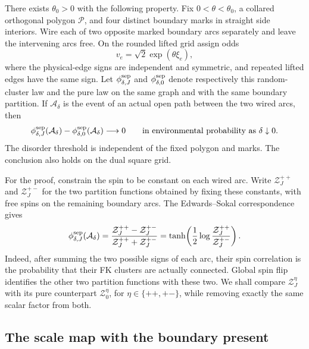 \begin{proposition}
\label{prop:polygon-comparison}
There exists $\theta_0>0$ with the following property.  Fix
$0<\theta<\theta_0$, a collared orthogonal polygon $\mathcal P$, and
four distinct boundary marks in straight side interiors.  Wire each of
two opposite marked boundary arcs separately and leave the intervening
arcs free.  On the rounded lifted grid assign odds
\[
 v_e=\sqrt2\exp(\theta\xi_e),
\]
where the physical-edge signs are independent and symmetric, and
repeated lifted edges have the same sign.  Let $\phi_{\delta,J}^{\rm sep}$
and $\phi_{\delta,0}^{\rm sep}$ denote respectively this random-cluster
law and the pure law on the same graph and with the same boundary
partition.  If $\mathcal A_\delta$ is the event of an actual open path
between the two wired arcs, then
\begin{equation}\label{eq:polygon-comparison}
 \phi_{\delta,J}^{\rm sep}(\mathcal A_\delta)
 -\phi_{\delta,0}^{\rm sep}(\mathcal A_\delta)
 \longrightarrow0
 \qquad\text{in environmental probability as }\delta\downarrow0.
\end{equation}
The disorder threshold is independent of the fixed polygon and marks.
The conclusion also holds on the dual square grid.
\end{proposition}

For the proof, constrain the spin to be constant on each wired arc.
Write $\mathcal Z_J^{++}$ and $\mathcal Z_J^{+-}$ for the two partition
functions obtained by fixing these constants, with free spins on the
remaining boundary arcs.  The Edwards--Sokal correspondence gives
\begin{equation}\label{eq:polygon-spin-ratio}
 \phi_{\delta,J}^{\rm sep}(\mathcal A_\delta)
 =\frac{\mathcal Z_J^{++}-\mathcal Z_J^{+-}}
        {\mathcal Z_J^{++}+\mathcal Z_J^{+-}}
 =\tanh\!\left(\frac12\log
                 \frac{\mathcal Z_J^{++}}{\mathcal Z_J^{+-}}\right).
\end{equation}
Indeed, after summing the two possible signs of each arc, their spin
correlation is the probability that their FK clusters are actually
connected.  Global spin flip identifies the other two partition
functions with these two.  We shall compare $\mathcal Z_J^\eta$ with its
pure counterpart $\mathcal Z_0^\eta$, for $\eta\in\{++, +-\}$, while
removing exactly the same scalar factor from both.

\subsection{The scale map with the boundary present}

